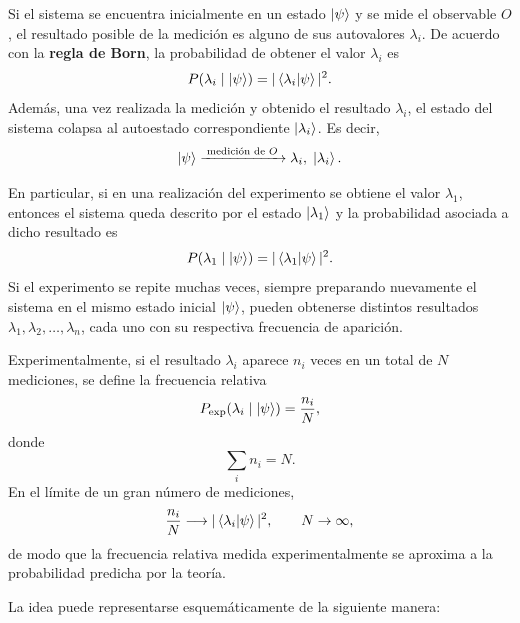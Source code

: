 \documentclass[../main.tex]{subfiles}
\begin{document}
Si el sistema se encuentra inicialmente en un estado $\ket{\psi}$ y se mide el observable $O$, el resultado posible de la medición es alguno de sus autovalores $\lambda_i$. De acuerdo con la \textbf{regla de Born}, la probabilidad de obtener el valor $\lambda_i$ es
\begin{equation*}
    P(\lambda_i \mid \ket{\psi}) = |\braket{\lambda_i|\psi}|^2.
\end{equation*}
Además, una vez realizada la medición y obtenido el resultado $\lambda_i$, el estado del sistema colapsa al autoestado correspondiente $\ket{\lambda_i}$. Es decir,
\begin{equation*}
    \ket{\psi}
    \xrightarrow{\;\text{medición de }O\;}
    \lambda_i,\;\ket{\lambda_i}.
\end{equation*}

En particular, si en una realización del experimento se obtiene el valor $\lambda_1$, entonces el sistema queda descrito por el estado $\ket{\lambda_1}$ y la probabilidad asociada a dicho resultado es
\begin{equation*}
    P(\lambda_1 \mid \ket{\psi}) = |\braket{\lambda_1|\psi}|^2.
\end{equation*}
Si el experimento se repite muchas veces, siempre preparando nuevamente el sistema en el mismo estado inicial $\ket{\psi}$, pueden obtenerse distintos resultados $\lambda_1,\lambda_2,\dots,\lambda_n$, cada uno con su respectiva frecuencia de aparición.

Experimentalmente, si el resultado $\lambda_i$ aparece $n_i$ veces en un total de $N$ mediciones, se define la frecuencia relativa
\begin{equation*}
    P_{\mathrm{exp}}(\lambda_i \mid \ket{\psi}) = \frac{n_i}{N},
\end{equation*}
donde
\begin{equation*}
    \sum_i n_i = N.
\end{equation*}
En el límite de un gran número de mediciones,
\begin{equation*}
    \frac{n_i}{N} \longrightarrow |\braket{\lambda_i|\psi}|^2,
    \qquad N\to\infty,
\end{equation*}
de modo que la frecuencia relativa medida experimentalmente se aproxima a la probabilidad predicha por la teoría.

La idea puede representarse esquemáticamente de la siguiente manera:
\end{document}
